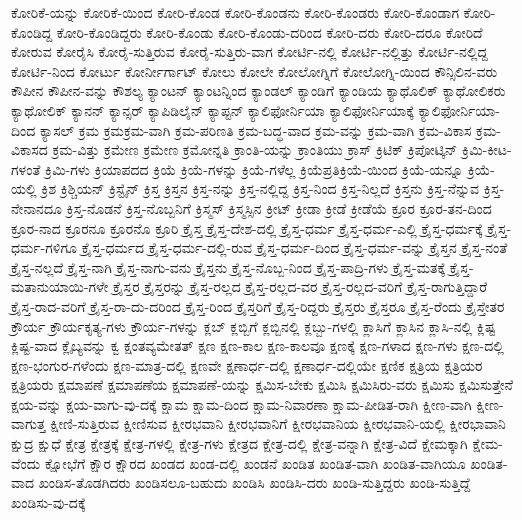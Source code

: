 {ಕೋರಿಕೆ-ಯನ್ನು
ಕೋರಿಕೆ-ಯಿಂದ
ಕೋರಿ-ಕೊಂಡ
ಕೋರಿ-ಕೊಂಡನು
ಕೋರಿ-ಕೊಂಡರು
ಕೋರಿ-ಕೊಂಡಾಗ
ಕೋರಿ-ಕೊಂಡಿದ್ದ
ಕೋರಿ-ಕೊಂಡಿದ್ದರು
ಕೋರಿ-ಕೊಂಡು
ಕೋರಿ-ಕೊಂಡು-ದರಿಂದ
ಕೋರಿ-ದರು
ಕೋರಿ-ದರೂ
ಕೋರಿದೆ
ಕೋರುವ
ಕೋರೈಸಿ
ಕೋರೈ-ಸುತ್ತಿರುವ
ಕೋರೈ-ಸುತ್ತಿರು-ವಾಗ
ಕೋರ್ಟಿ-ನಲ್ಲಿ
ಕೋರ್ಟಿ-ನಲ್ಲಿತ್ತು
ಕೋರ್ಟಿ-ನಲ್ಲಿದ್ದ
ಕೋರ್ಟಿ-ನಿಂದ
ಕೋರ್ಟು
ಕೋರ್ನೀರ್ಗಾಟ್
ಕೋಲು
ಕೋಲೇ
ಕೋಲೋಗ್ನಿಗೆ
ಕೋಲೋಗ್ನಿ-ಯಿಂದ
ಕೌನ್ಸಿಲಿನ-ವರು
ಕೌಪೀನ
ಕೌಪೀನ-ವನ್ನು
ಕೌಶಲ್ಯ
ಕ್ಯಾಂಟನ್
ಕ್ಯಾಂಟನ್ನಿಂದ
ಕ್ಯಾಂಡಲ್
ಕ್ಯಾಂಡಿಗೆ
ಕ್ಯಾಂಡಿಯ
ಕ್ಯಾಥೊಲಿಕ್
ಕ್ಯಾಥೋಲಿಕರು
ಕ್ಯಾಥೋಲಿಕ್
ಕ್ಯಾನನ್
ಕ್ಯಾನ್ಸರ್
ಕ್ಯಾಪಿಡಿಲೈನ್
ಕ್ಯಾಪ್ಟನ್
ಕ್ಯಾಲಿಫೋರ್ನಿಯಾ
ಕ್ಯಾಲಿಫೋರ್ನಿಯಾಕ್ಕೆ
ಕ್ಯಾಲಿಫೋರ್ನಿಯಾ-ದಿಂದ
ಕ್ಯಾಸಲ್
ಕ್ರಮ
ಕ್ರಮಕ್ರಮ-ವಾಗಿ
ಕ್ರಮ-ಪರಿಣತಿ
ಕ್ರಮ-ಬದ್ಧ-ವಾದ
ಕ್ರಮ-ವನ್ನು
ಕ್ರಮ-ವಾಗಿ
ಕ್ರಮ-ವಿಕಾಸ
ಕ್ರಮ-ವಿಕಾಸದ
ಕ್ರಮ-ವಿತ್ತು
ಕ್ರಮೇಣ
ಕ್ರಮೇಣ
ಕ್ರಮೋನ್ನತಿ
ಕ್ರಾಂತಿ-ಯನ್ನು
ಕ್ರಾಂತಿಯು
ಕ್ರಾಸ್
ಕ್ರಿಟಿಕ್
ಕ್ರಿಪೋಟ್ಕಿನ್
ಕ್ರಿಮಿ-ಕೀಟ-ಗಳಂತೆ
ಕ್ರಿಮಿ-ಗಳು
ಕ್ರಿಯಾಪದದ
ಕ್ರಿಯೆ
ಕ್ರಿಯೆ-ಗಳನ್ನು
ಕ್ರಿಯೆ-ಗಳೆಲ್ಲ
ಕ್ರಿಯೆಪ್ರತಿಕ್ರಿಯೆ-ಯಿಂದ
ಕ್ರಿಯೆ-ಯನ್ನೂ
ಕ್ರಿಯೆ-ಯಲ್ಲಿ
ಕ್ರಿಶ
ಕ್ರಿಶ್ಚಿಯನ್
ಕ್ರಿಸ್ಟೈನ್
ಕ್ರಿಸ್ತ
ಕ್ರಿಸ್ತನ
ಕ್ರಿಸ್ತ-ನನ್ನು
ಕ್ರಿಸ್ತ-ನಲ್ಲಿದ್ದ
ಕ್ರಿಸ್ತ-ನಿಂದ
ಕ್ರಿಸ್ತ-ನಿಲ್ಲದೆ
ಕ್ರಿಸ್ತನು
ಕ್ರಿಸ್ತ-ನೆನ್ನುವ
ಕ್ರಿಸ್ತ-ನೇನಾನದೂ
ಕ್ರಿಸ್ತ-ನೊಡನೆ
ಕ್ರಿಸ್ತ-ನೊಬ್ಬನಿಗೆ
ಕ್ರಿಸ್ಮಸ್
ಕ್ರಿಸ್ಮಸ್ಸಿನ
ಕ್ರೀಟ್
ಕ್ರೀಡಾ
ಕ್ರೀಡೆ
ಕ್ರೀಡೆಯೆ
ಕ್ರೂರ
ಕ್ರೂರ-ತನ-ದಿಂದ
ಕ್ರೂರ-ನಾದ
ಕ್ರೂರನೂ
ಕ್ರೂರನೊ
ಕ್ರೂರಿ
ಕ್ರೈಸ್ತ
ಕ್ರೈಸ್ತ-ದೇಶ-ದಲ್ಲಿ
ಕ್ರೈಸ್ತ-ಧರ್ಮ
ಕ್ರೈಸ್ತ-ಧರ್ಮ-ಎಲ್ಲಿ
ಕ್ರೈಸ್ತ-ಧರ್ಮಕ್ಕೆ
ಕ್ರೈಸ್ತ-ಧರ್ಮ-ಗಳಿಗೂ
ಕ್ರೈಸ್ತ-ಧರ್ಮದ
ಕ್ರೈಸ್ತ-ಧರ್ಮ-ದಲ್ಲಿ-ರುವ
ಕ್ರೈಸ್ತ-ಧರ್ಮ-ದಿಂದ
ಕ್ರೈಸ್ತ-ಧರ್ಮ-ವನ್ನು
ಕ್ರೈಸ್ತನ
ಕ್ರೈಸ್ತ-ನಂತೆ
ಕ್ರೈಸ್ತ-ನಲ್ಲದೆ
ಕ್ರೈಸ್ತ-ನಾಗಿ
ಕ್ರೈಸ್ತ-ನಾಗು-ವನು
ಕ್ರೈಸ್ತನು
ಕ್ರೈಸ್ತ-ನೊಬ್ಬ-ನಿಂದ
ಕ್ರೈಸ್ತ-ಪಾದ್ರಿ-ಗಳು
ಕ್ರೈಸ್ತ-ಮತಕ್ಕೆ
ಕ್ರೈಸ್ತ-ಮತಾನುಯಾಯಿ-ಗಳೇ
ಕ್ರೈಸ್ತರ
ಕ್ರೈಸ್ತರನ್ನು
ಕ್ರೈಸ್ತ-ರಲ್ಲದ
ಕ್ರೈಸ್ತ-ರಲ್ಲದ-ವರ
ಕ್ರೈಸ್ತ-ರಲ್ಲದ-ವರಿಗೆ
ಕ್ರೈಸ್ತ-ರಾಗುತ್ತಿದ್ದಾರೆ
ಕ್ರೈಸ್ತ-ರಾದ-ವರಿಗೆ
ಕ್ರೈಸ್ತ-ರಾ-ದು-ದರಿಂದ
ಕ್ರೈಸ್ತ-ರಿಂದ
ಕ್ರೈಸ್ತರಿಗೆ
ಕ್ರೈಸ್ತ-ರಿದ್ದರು
ಕ್ರೈಸ್ತರು
ಕ್ರೈಸ್ತರೂ
ಕ್ರೈಸ್ತ-ರೆಂದು
ಕ್ರೈಸ್ತೇತರ
ಕ್ರೌರ್ಯ
ಕ್ರೌರ್ಯಕೃತ್ಯ-ಗಳು
ಕ್ರೌರ್ಯ-ಗಳನ್ನು
ಕ್ಲಬ್
ಕ್ಲಬ್ಬಿಗೆ
ಕ್ಲಬ್ಬಿನಲ್ಲಿ
ಕ್ಲಬ್ಬು-ಗಳಲ್ಲಿ
ಕ್ಲಾಸಿಗೆ
ಕ್ಲಾಸಿನ
ಕ್ಲಾಸಿ-ನಲ್ಲಿ
ಕ್ಲಿಷ್ಟ
ಕ್ಲಿಷ್ಟ-ವಾದ
ಕ್ಲೈಬ್ಯವನ್ನು
ಕ್ವ
ಕ್ಷಂತವ್ಯಮೇತತ್
ಕ್ಷಣ
ಕ್ಷಣ-ಕಾಲ
ಕ್ಷಣ-ಕಾಲವೂ
ಕ್ಷಣಕ್ಕೆ
ಕ್ಷಣ-ಗಳಾದ
ಕ್ಷಣ-ಗಳು
ಕ್ಷಣ-ದಲ್ಲಿ
ಕ್ಷಣ-ಭಂಗುರ-ಗಳೆಂದು
ಕ್ಷಣ-ಮಾತ್ರ-ದಲ್ಲಿ
ಕ್ಷಣವೇ
ಕ್ಷಣಾರ್ಧ-ದಲ್ಲಿ
ಕ್ಷಣಾರ್ಧ-ದಲ್ಲಿಯೇ
ಕ್ಷಣಿಕ
ಕ್ಷತ್ರಿಯ
ಕ್ಷತ್ರಿಯರ
ಕ್ಷತ್ರಿಯರು
ಕ್ಷಮಾಪಣೆ
ಕ್ಷಮಾಪಣೆಯ
ಕ್ಷಮಾಪಣೆ-ಯನ್ನು
ಕ್ಷಮಿಸ-ಬೇಕು
ಕ್ಷಮಿಸಿ
ಕ್ಷಮಿಸಿರು-ವರು
ಕ್ಷಮಿಸು
ಕ್ಷಮಿಸುತ್ತೇನೆ
ಕ್ಷಯ-ವನ್ನು
ಕ್ಷಯ-ವಾಗು-ವು-ದಕ್ಕೆ
ಕ್ಷಾಮ
ಕ್ಷಾಮ-ದಿಂದ
ಕ್ಷಾಮ-ನಿವಾರಣಾ
ಕ್ಷಾಮ-ಪೀಡಿತ-ರಾಗಿ
ಕ್ಷೀಣ-ವಾಗಿ
ಕ್ಷೀಣ-ವಾಗುತ್ತ
ಕ್ಷೀಣಿ-ಸುತ್ತಿರುವ
ಕ್ಷೀಣಿಸುವ
ಕ್ಷೀರಭವಾನಿ
ಕ್ಷೀರಭವಾನಿಗೆ
ಕ್ಷೀರಭವಾನಿಯ
ಕ್ಷೀರಭವಾನಿ-ಯಲ್ಲಿ
ಕ್ಷೀರಭಾವಾನಿ
ಕ್ಷುದ್ರ
ಕ್ಷುಧೆ
ಕ್ಷೇತ್ರ
ಕ್ಷೇತ್ರಕ್ಕೆ
ಕ್ಷೇತ್ರ-ಗಳಲ್ಲಿ
ಕ್ಷೇತ್ರ-ಗಳು
ಕ್ಷೇತ್ರದ
ಕ್ಷೇತ್ರ-ದಲ್ಲಿ
ಕ್ಷೇತ್ರ-ವನ್ನಾಗಿ
ಕ್ಷೇತ್ರ-ವಿದೆ
ಕ್ಷೇಮಕ್ಕಾಗಿ
ಕ್ಷೇಮ-ವೆಂದು
ಕ್ಷೋಭೆಗೆ
ಕ್ಷೌರ
ಕ್ಷೌರದ
ಖಂಡದ
ಖಂಡ-ದಲ್ಲಿ
ಖಂಡನೆ
ಖಂಡಿತ
ಖಂಡಿತ-ವಾಗಿ
ಖಂಡಿತ-ವಾಗಿಯೂ
ಖಂಡಿತ-ವಾದ
ಖಂಡಿಸ-ತೊಡಗಿದರು
ಖಂಡಿಸಲೂ-ಬಹುದು
ಖಂಡಿಸಿ
ಖಂಡಿಸಿ-ದರು
ಖಂಡಿ-ಸುತ್ತಿದ್ದರು
ಖಂಡಿ-ಸುತ್ತಿದ್ದೆ
ಖಂಡಿಸು-ವು-ದಕ್ಕೆ
}
